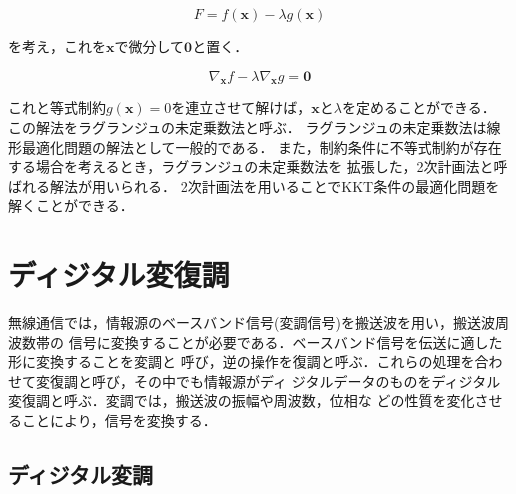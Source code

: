 \begin{equation}
    F = f(\bm{x}) - \lambda g(\bm{x})
\end{equation}

を考え，これを$\bm{x}$で微分して$\bm{0}$と置く．

\begin{equation}
    \nabla_{\bm{x}}f - \lambda\nabla_{\bm{x}}g = \bm{0}
\end{equation}

これと等式制約$g(\bm{x})=0$を連立させて解けば，$\bm{x}$と$\lambda$を定めることができる．
この解法をラグランジュの未定乗数法と呼ぶ． \cite{kanatani}
ラグランジュの未定乗数法は線形最適化問題の解法として一般的である．
また，制約条件に不等式制約が存在する場合を考えるとき，ラグランジュの未定乗数法を
拡張した，2次計画法と呼ばれる解法が用いられる．
2次計画法を用いることでKKT条件の最適化問題を解くことができる．

\section{ディジタル変復調}
無線通信では，情報源のベースバンド信号(変調信号)を搬送波を用い，搬送波周波数帯の
信号に変換することが必要である．ベースバンド信号を伝送に適した形に変換することを変調と
呼び，逆の操作を復調と呼ぶ．これらの処理を合わせて変復調と呼び，その中でも情報源がディ
ジタルデータのものをディジタル変復調と呼ぶ\cite{takahata}．変調では，搬送波の振幅や周波数，位相な
どの性質を変化させることにより，信号を変換する．

\subsection{ディジタル変調}
